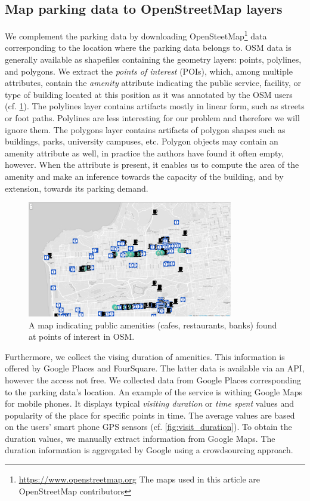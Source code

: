\documentclass{ws-ijait}
\begin{document}
	\subsection{Map parking data to OpenStreetMap layers}
	We complement the parking data by downloading OpenSteetMap\footnote{\url{https://www.openstreetmap.org} The maps used in this article are \textcopyright OpenStreetMap contributors} data corresponding to the location where the parking data belongs to. OSM data is generally available as shapefiles containing the geometry layers: points, polylines, and polygons. We extract the \textit{points of interest} (POIs), which, among multiple attributes, contain the \textit{amenity} attribute indicating the public service, facility, or type of building located at this position as it was annotated by the OSM users (cf. \cref{fig:pois}). The polylines layer contains artifacts mostly in linear form, such as streets or foot paths. Polylines are less interesting for our problem and therefore we will ignore them. The polygons layer contains artifacts of polygon shapes such as buildings, parks, university campuses, etc. Polygon objects may contain an amenity attribute as well, in practice the authors have found it often empty, however. When the attribute is present, it enables us to compute the area of the amenity and make an inference towards the capacity of the building, and by extension, towards its parking demand.
	
	\begin{figure}[!ht]
		\centering
		\includegraphics[width=0.8\textwidth]{../graphics/cafes_restaurants_banks_larger.png}
		\caption{A map indicating public amenities (cafes, restaurants, banks) found at points of interest in OSM.}
		\label{fig:pois}
	\end{figure}
	
	Furthermore, we collect the vising duration of amenities. This information is offered by Google Places and FourSquare. The latter data is available via an API, however the access not free. We collected data from Google Places corresponding to the parking data's location. An example of the service is withing Google Maps for mobile phones. It displays typical \textit{visiting duration} or \textit{time spent} values and popularity of the place for specific points in time. The average values are based on the users' smart phone GPS sensors (cf. \cref{fig:visit_duration}). To obtain the duration values, we manually extract information from Google Maps. The duration information is aggregated by Google using a crowdsourcing approach. 
	
\end{document}
